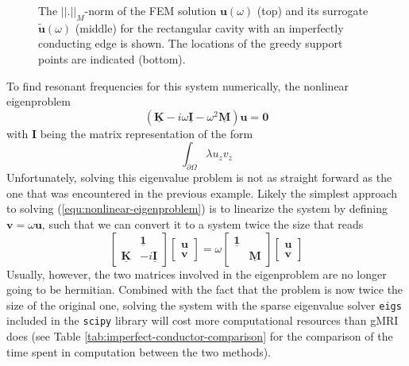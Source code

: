 \documentclass[11pt, a4paper]{article}
\begin{document}
\begin{figure}[ht]
    \centering
    
    \caption{The $||.||_M$-norm of the \acrshort{FEM} solution $\mathbf{u}(\omega)$ (top) and
    its surrogate $\mathbf{\tilde{u}}(\omega)$ (middle) for the rectangular cavity with
    an imperfectly conducting edge is shown. The locations of the greedy support
    points are indicated (bottom).}
    \label{fig:imperfect-conductor-norms}
\end{figure}

To find resonant frequencies for this system numerically, the nonlinear eigenproblem
\begin{equation}
    (\mathbf{\underline{K}} - i \omega \mathbf{\underline{I}} - \omega^2 \mathbf{\underline{M}}) \mathbf{u} = \mathbf{0} \label{equ:nonlinear-eigenproblem}
\end{equation}
with $\mathbf{I}$ being the matrix representation of the form
\begin{equation}
    \int_{\partial \Omega} \lambda u_z v_z 
\end{equation}
Unfortunately, solving this eigenvalue problem is not as straight forward as the
one that was encountered in the previous example. Likely the simplest approach
to solving (\ref{equ:nonlinear-eigenproblem}) is to linearize the system by
defining $\mathbf{v} = \omega \mathbf{u}$, such that we can convert it to a
system twice the size that reads
\begin{equation}
    \begin{bmatrix}
         & \boldsymbol{\underline{1}} \\
        \mathbf{\underline{K}} & -i \mathbf{\underline{I}}
    \end{bmatrix}
    \begin{bmatrix}
        \mathbf{u} \\
        \mathbf{v}
    \end{bmatrix}
    =
    \omega
    \begin{bmatrix}
        \boldsymbol{\underline{1}} & \\
         & \boldsymbol{\underline{M}}
    \end{bmatrix}
    \begin{bmatrix}
        \mathbf{u} \\
        \mathbf{v}
    \end{bmatrix}
\end{equation}
Usually, however, the two matrices involved in the eigenproblem are no longer
going to be hermitian. Combined with the fact that the problem is now twice
the size of the original one, solving the system with the sparse eigenvalue
solver \texttt{eigs} included in the \texttt{scipy} library will cost more
computational resources than \acrshort{gMRI} does (see Table \ref{tab:imperfect-conductor-comparison}
for the comparison of the time spent in computation between the two methods).
\end{document}

